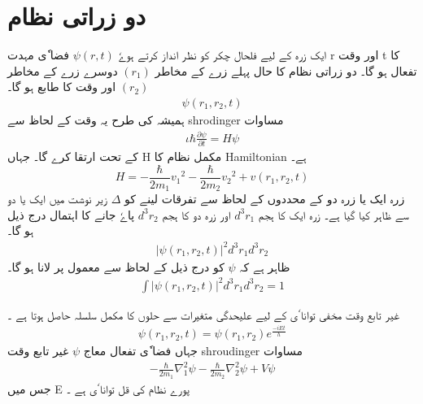 \section{ دو   زراتی نظام} 

ایک زرہ کے لیے فلحال چکر کو نظر انداز کرتے ہوےٗ  
$ \psi ( r , t ) $
فضا ٗی مہدت r اور وقت t کا تفعال ہو گا۔ دو زراتی نظام کا حال پہلے زرے کے مخاطر 
$ ( r_1 ) $
دوسرے زرے کے مخاطر 
$ ( r_2 ) $
اور وقت کا طابع ہو گا۔ 
\begin{align}   
\psi ( r_1 , r_2 , t ) 
\end{align}
 ہمیشہ کی طرح یہ وقت کے لحاظ سے shrodinger مساوات 
\begin{align}
\iota \hbar \frac{ \partial \psi }{ \partial t } = H \psi
\end{align}
کے تحت ارتقا کرے گا۔ جہاں H مکمل  نظام کا Hamiltonian  ہے۔
\begin{equation}
H = - \frac{ \hbar }{ 2 m_1 } {v_1}^2  -  \frac{ \hbar }{ 2 m_2 } { v_2 }^2 +  v( r_1 , r_2 , t )
\end{equation}
زرہ ایک یا زرہ دو کے محددوں کے لحاظ سے  تفرقات لینے کو 
$ \Delta $
زیر نوشت میں ایک یا دو سے ظاہر کیا گیا ہے۔ زرہ ایک کا ہجم 
$ d^3 r_1 $
اور زرہ دو کا ہجم
$ d^3 r_2 $
پاےٗ جانے کا اہتمال درج ذیل ہو گا۔ 
\begin{align}
| \psi ( r_1 , r_2 , t ) |^2 { d^3 } { r_1 }  { d^3 } { r_2 }
\end{align}
ظاہر ہے کہ 
$ \psi $
کو درج ذیل کے لحاظ سے معمول پر لانا ہو گا۔ 
\begin{align}
\int | \psi ( r_1 , r_2 , t ) |^2 { d^3 } { r_1 } { d^3 } { r_2 } = 1
\end{align}

\newpage

غیر تابع وقت مخفی توانا ٗی کے لیے علیحدگی  متغیرات  سے حلوں کا مکمل سلسلہ حاصل ہوتا ہے ۔ 
\begin{align}
\psi ( r_1 , r_2 , t ) =  \psi ( r_1 , r_2 ) {e}^\frac{ - i E t }{h}  
\end{align}
جہاں فضا ٗی تفعال معاج 
$ \psi $
غیر تابع وقت shroudinger مساوات 
\begin{align}
-\frac{ \hbar }{ 2 m_1 }  {\nabla_1^2} { \psi } - \frac{ \hbar }{ 2 m_2 } \nabla_2^2 { \psi } + V \psi 
\end{align}
جس میں E پورے نظام کی قل توانا ٗی ہے ۔ 

